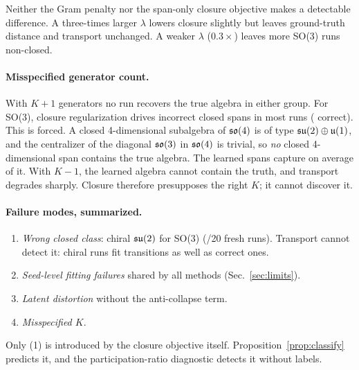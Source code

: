 Neither the Gram penalty nor the span-only closure objective makes a detectable difference. A three-times larger
$\lambda$ lowers closure slightly but leaves ground-truth distance and transport unchanged. A weaker $\lambda$
($0.3\times$) leaves more SO(3) runs non-closed.

\paragraph{Misspecified generator count.}
With $K{+}1$ generators no run recovers the true algebra in either group. For SO(3), closure regularization drives
incorrect closed spans in most runs (\NAbSOthreeKplusoneCc{} correct). This is forced. A closed 4-dimensional
subalgebra of $\mathfrak{so}(4)$ is of type $\mathfrak{su}(2)\oplus\mathfrak u(1)$, and the centralizer of the diagonal $\mathfrak{so}(3)$ in
$\mathfrak{so}(4)$ is trivial, so \emph{no} closed 4-dimensional span contains the true algebra. The learned spans capture on
average \NAbSOthreeKplusoneGtcoverage{} of it. With $K{-}1$, the learned algebra cannot contain the truth, and transport degrades sharply. Closure therefore
presupposes the right $K$; it cannot discover it.

\paragraph{Failure modes, summarized.}
\begin{enumerate}
\item \emph{Wrong closed class}: chiral $\mathfrak{su}(2)$ for SO(3) (\NSOthreeBNChiral/20 fresh runs). Transport cannot
detect it: chiral runs fit transitions as well as correct ones.
\item \emph{Seed-level fitting failures} shared by all methods (Sec.~\ref{sec:limits}).
\item \emph{Latent distortion} without the anti-collapse term.
\item \emph{Misspecified $K$}.
\end{enumerate}
Only (1) is introduced by the closure objective itself. Proposition~\ref{prop:classify} predicts it, and the
participation-ratio diagnostic detects it without labels.
